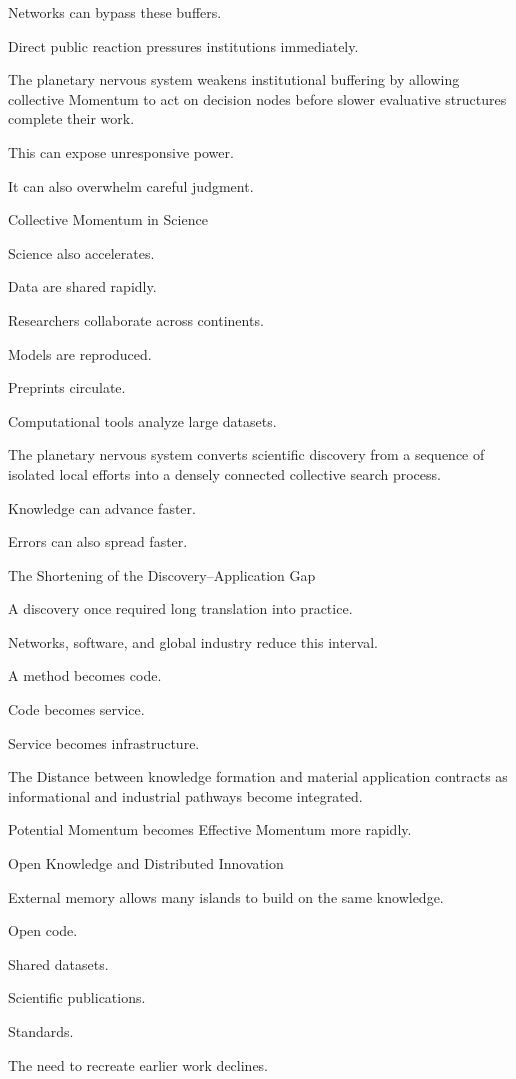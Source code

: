 Networks can bypass these buffers.

Direct public reaction pressures institutions immediately.

The planetary nervous system weakens institutional buffering by allowing collective Momentum to act on decision nodes before slower evaluative structures complete their work.

This can expose unresponsive power.

It can also overwhelm careful judgment.

Collective Momentum in Science

Science also accelerates.

Data are shared rapidly.

Researchers collaborate across continents.

Models are reproduced.

Preprints circulate.

Computational tools analyze large datasets.

The planetary nervous system converts scientific discovery from a sequence of isolated local efforts into a densely connected collective search process.

Knowledge can advance faster.

Errors can also spread faster.

The Shortening of the Discovery–Application Gap

A discovery once required long translation into practice.

Networks, software, and global industry reduce this interval.

A method becomes code.

Code becomes service.

Service becomes infrastructure.

The Distance between knowledge formation and material application contracts as informational and industrial pathways become integrated.

Potential Momentum becomes Effective Momentum more rapidly.

Open Knowledge and Distributed Innovation

External memory allows many islands to build on the same knowledge.

Open code.

Shared datasets.

Scientific publications.

Standards.

The need to recreate earlier work declines.

